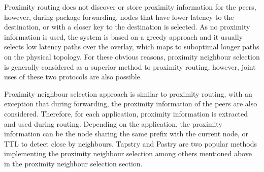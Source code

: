 Proximity routing does not discover or store proximity information for the
peers, however, during package forwarding, nodes that have lower latency to the
destination, or with a closer key to the destination is selected. As no
proximity information is used, the system is based on a greedy approach and it
usually selects low latency paths over the overlay, which maps to suboptimal
longer paths on the physical topology. For these obvious reasons, proximity
neighbour selection is generally considered as a superior method to proximity
routing, however, joint uses of these two protocols are also possible.

Proximity neighbour selection approach is similar to proximity routing, with an
exception that during forwarding, the proximity information of the peers are
also considered. Therefore, for each application, proximity information is
extracted and used during routing. Depending on the application, the proximity
information can be the node sharing the same prefix with the current node, or
TTL to detect close by neighbours. Tapstry and Pastry are two popular methods
implementing the proximity neighbour selection among others mentioned above in the
proximity neighbour selection section.
